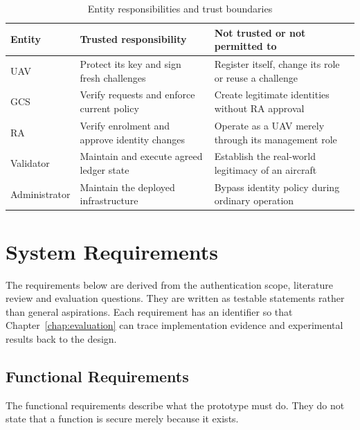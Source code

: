 \begin{table}[htbp]
    \centering
    \caption{Entity responsibilities and trust boundaries}
    \label{tab:entity-trust-summary}
    \begin{tabular}{|p{}|p{}|p{}|}
        \hline
        \textbf{Entity} & \textbf{Trusted responsibility} & \textbf{Not trusted or not permitted to} \\
        \hline
        UAV & Protect its key and sign fresh challenges & Register itself, change its role or reuse a challenge \\
        \hline
        GCS & Verify requests and enforce current policy & Create legitimate identities without RA approval \\
        \hline
        RA & Verify enrolment and approve identity changes & Operate as a UAV merely through its management role \\
        \hline
        Validator & Maintain and execute agreed ledger state & Establish the real-world legitimacy of an aircraft \\
        \hline
        Administrator & Maintain the deployed infrastructure & Bypass identity policy during ordinary operation \\
        \hline
    \end{tabular}
\end{table}

\section{System Requirements}
\label{sec:system-requirements}

The requirements below are derived from the authentication scope, literature review and evaluation questions. They are written as testable statements rather than general aspirations. Each requirement has an identifier so that Chapter~\ref{chap:evaluation} can trace implementation evidence and experimental results back to the design.

\subsection{Functional Requirements}
\label{subsec:functional-requirements}

The functional requirements describe what the prototype must do. They do not state that a function is secure merely because it exists.

